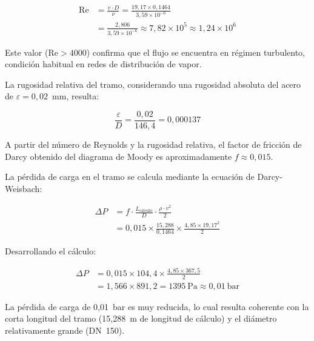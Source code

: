 \documentclass[12pt]{article}
\begin{document}
\begin{equation}
	\begin{split}
		\text{Re} & = \frac{v \cdot D}{\nu} = \frac{19{,}17 \times 0{,}1464}{3{,}59 \times 10^{-6}}               \\
		          & = \frac{2{,}806}{3{,}59 \times 10^{-6}} \approx 7{,}82 \times 10^5 \approx 1{,}24 \times 10^6
	\end{split}
	\label{eq:reynolds-tramo1}
\end{equation}

Este valor ($\text{Re} > 4000$) confirma que el flujo se encuentra en régimen turbulento, condición habitual en redes de distribución de vapor.

La rugosidad relativa del tramo, considerando una rugosidad absoluta del acero de $\varepsilon = 0{,}02$~mm, resulta:

\begin{equation}
	\frac{\varepsilon}{D} = \frac{0{,}02}{146{,}4} = 0{,}000137
	\label{eq:rugosidad-relativa-tramo1}
\end{equation}

A partir del número de Reynolds y la rugosidad relativa, el factor de fricción de Darcy obtenido del diagrama de Moody es aproximadamente $f \approx 0{,}015$.

La pérdida de carga en el tramo se calcula mediante la ecuación de Darcy-Weisbach:

\begin{equation}
	\begin{split}
		\Delta P & = f \cdot \frac{L_{\text{cálculo}}}{D} \cdot \frac{\rho \cdot v^2}{2}               \\
		         & = 0{,}015 \times \frac{15{,}288}{0{,}1464} \times \frac{4{,}85 \times 19{,}17^2}{2}
	\end{split}
	\label{eq:darcy-tramo1}
\end{equation}

Desarrollando el cálculo:

\begin{equation}
	\begin{split}
		\Delta P & = 0{,}015 \times 104{,}4 \times \frac{4{,}85 \times 367{,}5}{2}         \\
		         & = 1{,}566 \times 891{,}2 = 1395 \ \text{Pa} \approx 0{,}01 \ \text{bar}
	\end{split}
	\label{eq:perdida-carga-tramo1}
\end{equation}

La pérdida de carga de 0,01~bar es muy reducida, lo cual resulta coherente con la corta longitud del tramo (15,288~m de longitud de cálculo) y el diámetro relativamente grande (DN~150).
\end{document}
